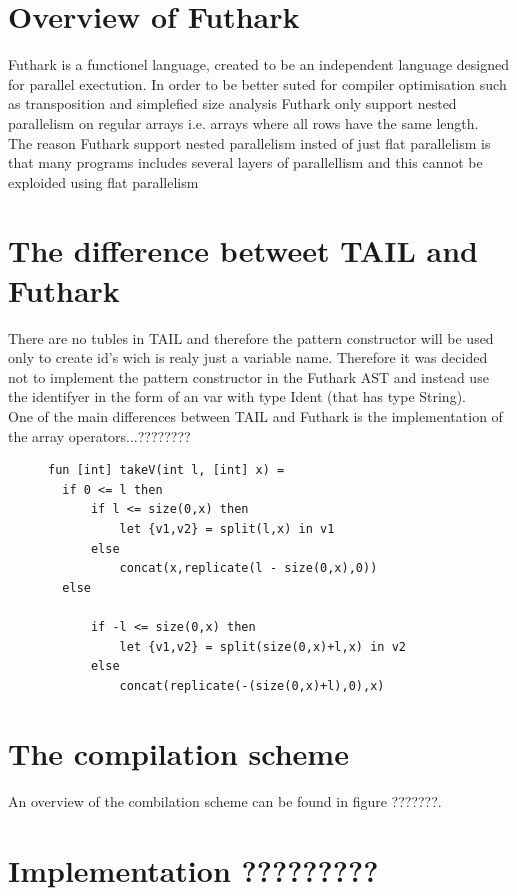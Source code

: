 \documentclass[11pt]{article}
\begin{document}
\section{Overview of Futhark}
Futhark is a functionel language, created to be an independent language designed for parallel exectution. In order to be better suted for compiler optimisation such as transposition and simplefied size analysis Futhark only support nested parallelism on regular arrays i.e. arrays where all rows have the same length.\\

The reason Futhark support nested parallelism insted of just flat parallelism is that many programs includes several layers of parallellism and this cannot be exploided using flat parallelism %

\section{The difference betweet TAIL and Futhark}
There are no tubles in TAIL and therefore the pattern constructor will be used only to create id's wich is realy just a variable name. Therefore it was decided not to implement the pattern constructor in the Futhark AST and instead use the identifyer in the form of an var with type Ident (that has type String). \\

One of the main differences between TAIL and Futhark is the implementation of the array operators...???????? \\
\begin{figure}
\begin{lstlisting}
fun [int] takeV(int l, [int] x) =
  if 0 <= l then
      if l <= size(0,x) then
          let {v1,v2} = split(l,x) in v1
      else
          concat(x,replicate(l - size(0,x),0))
  else
  
      if -l <= size(0,x) then
          let {v1,v2} = split(size(0,x)+l,x) in v2
      else
          concat(replicate(-(size(0,x)+l),0),x)
\end{lstlisting}
\end{figure}
\section{The compilation scheme}
An overview of the combilation scheme can be found in figure ???????. 

\section{Implementation ?????????}
\end{document}
